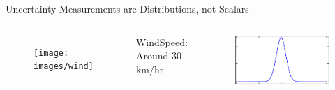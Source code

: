 \begin{frame}{Uncertainty }
Measurements are Distributions, not Scalars

\begin{columns}

\begin{figure}[ht]
\texttt{[image: images/wind]}
\end{figure}
WindSpeed:
Around 30 km/hr
\begin{figure}[ht]
\includegraphics[width=\textwidth]{images/normal}
\end{figure}


\end{columns}
\end{frame}
